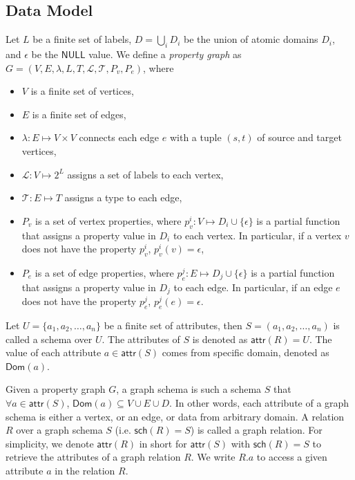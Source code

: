 \documentclass[sigconf, nonacm]{acmart}
\newcommand{\kw}[1]{{\ensuremath {\mathsf{#1}}}\xspace}
\newcommand{\attr}{\kw{attr}}
\newcommand{\sch}{\kw{sch}}
\newcommand{\Dom}{\kw{Dom}}
\newcommand{\vlabel}{\mathcal{L}}
\newcommand{\elabel}{\mathcal{T}}
\begin{document}
\subsection{Data Model}
Let $L$ be a finite set of labels, $D = \bigcup_i D_i$ be the union of atomic domains $D_i$, and $\epsilon$ be the \kw{NULL} value. We define a \textit{property graph} as $G = (V, E, \lambda, L, T, \vlabel, \elabel, P_v, P_e)$, where
\begin{itemize}
    \item $V$ is a finite set of vertices,
    \item $E$ is a finite set of edges,
    \item $\lambda: E \mapsto V \times V$ connects each edge $e$ with a tuple $(s, t)$ of source and target vertices,
    \item $\vlabel: V \mapsto 2^L$ assigns a set of labels to each vertex,
    \item $\elabel: E \mapsto T$ assigns a type to each edge,
    \item $P_v$ is a set of vertex properties, where $p_v^i: V \mapsto D_i \cup \{\epsilon\}$ is a partial function that assigns a property value in $D_i$ to each vertex. 
    In particular, if a vertex $v$ does not have the property $p_v^i$, $p_v^i(v) = \epsilon$,
    \item $P_e$ is a set of edge properties, where $p_e^j: E \mapsto D_j \cup \{\epsilon\}$ is a partial function that assigns a property value in $D_j$ to each edge. 
    In particular, if an edge $e$ does not have the property $p_e^j$, $p_e^j(e) = \epsilon$.
\end{itemize}

Let $U = \{a_1, a_2, \ldots, a_n\}$ be a finite set of attributes, then $S = (a_1, a_2, \ldots, a_n)$ is called a schema over $U$. 
The attributes of $S$ is denoted as $\attr(R) = U$. The value of each attribute $a \in \attr(S)$ comes from specific domain, denoted as $\Dom(a)$.

Given a property graph $G$, a graph schema is such a schema $S$ that $\forall a \in \attr(S)$, $\Dom(a) \subseteq V \cup E \cup D$. 
In other words, each attribute of a graph schema is either a vertex, or an edge, or data from arbitrary domain. 
A relation $R$ over a graph schema $S$ (i.e. $\sch(R) = S$) is called a graph relation. 
For simplicity, we denote $\attr(R)$ in short for $\attr(S)$ with $\sch(R) = S$ to retrieve the attributes of a graph relation $R$. 
We write $R.a$ to access a given attribute $a$ in the relation $R$. 
\end{document}

